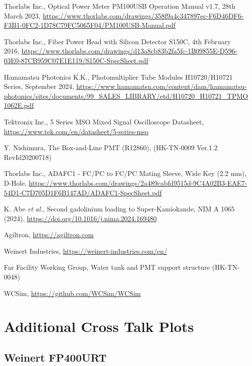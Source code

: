 \documentclass[a4paper,11pt]{article}
\begin{document}
\begin{thebibliography}{99}
Thorlabs Inc., Optical Power Meter PM100USB Operation Manual v1.7, 28th March 2023, \url{https://www.thorlabs.com/drawings/358f9a4c347897ec-F6D46DF6-F3B1-0FC2-1D78C79FC5065F04/PM100USB-Manual.pdf}

Thorlabs Inc., Fiber Power Head with Silicon Detector S150C, 4th February 2016, \url{https://www.thorlabs.com/drawings/d13a8cb83b2fa5fc-1B09855E-D596-03E0-87CB959C07E1E119/S150C-SpecSheet.pdf}

Hamamatsu Photonics K.K., Photomultiplier Tube Modules H10720/H10721 Series, September 2024, \url{https://www.hamamatsu.com/content/dam/hamamatsu-photonics/sites/documents/99_SALES_LIBRARY/etd/H10720_H10721_TPMO1062E.pdf}

Tektronix Inc., 5 Series MSO Mixed Signal Oscilloscope Datasheet, \url{https://www.tek.com/en/datasheet/5-series-mso}

Y. Nishimura, The Box-and-Line PMT (R12860), (HK-TN-0009 Ver.1.2 RevId20200718)

Thorlabs Inc., ADAFC1 - FC/PC to FC/PC Mating Sleeve, Wide Key (2.2 mm), D-Hole, \url{https://www.thorlabs.com/drawings/2a489cabfd9515d-9C4A02B3-EAE7-54D1-C7D705D1F6B147AD/ADAFC1-SpecSheet.pdf}

K. Abe {\it et al.}, Second gadolinium loading to Super-Kamiokande, NIM A 1065 (2024), \url{https://doi.org/10.1016/j.nima.2024.169480}


Agiltron, \url{https://agiltron.com}

Weinert Industries, \url{https://weinert-industries.com/en/}


Far Facility Working Group, Water tank and PMT support structure (HK-TN-0048)


WCSim, \url{https://github.com/WCSim/WCSim}

\end{thebibliography}

\clearpage
\newpage
\appendix

\section{Additional Cross Talk Plots}\label{app:crosstalk}

\subsection{Weinert FP400URT}
\end{document}

